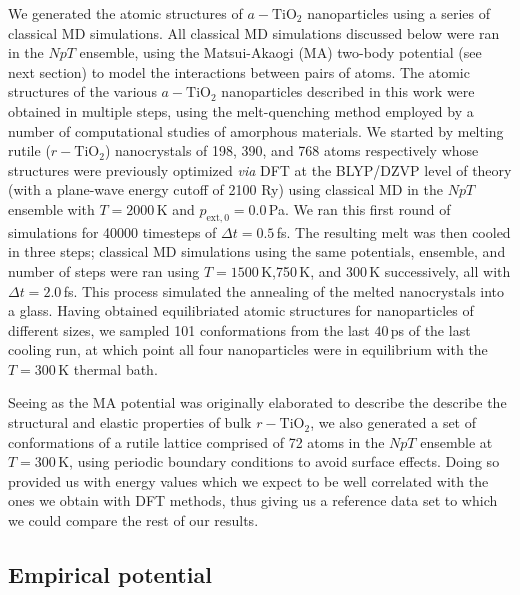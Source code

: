 \documentclass[aps,prb,twocolumn,amsmath,amssymb,superscriptaddress,longbibliography]{revtex4-1}
\newcommand\tab[1][1cm]{\hspace*{#1}} %
\begin{document}
\tab We generated the atomic structures of $a-\text{TiO}_2$ nanoparticles using a series of classical MD simulations. 
All classical MD simulations discussed below were ran in the $NpT$ ensemble, using the Matsui-Akaogi (MA) two-body potential (see next section) to model the interactions between pairs of atoms.
The atomic structures of the various $a-\text{TiO}_2$ nanoparticles described in this work were obtained in multiple steps, using the melt-quenching method employed by a number of computational studies of amorphous materials\cite{ab_initio,melt_quenching}.
We started by melting rutile ($r-\text{TiO}_2$) nanocrystals of 198, 390, and 768 atoms respectively whose structures were previously optimized \textit{via} DFT at the BLYP/DZVP level of theory (with a plane-wave energy cutoff of 2100 Ry) using classical MD in the $NpT$ ensemble with $T = 2000\,$K and $p_{\text{ext},0} = 0.0\,$Pa. 
We ran this first round of simulations for 40000 timesteps of $\Delta t = 0.5\,$fs.
The resulting melt was then cooled in three steps; classical MD simulations using the same potentials, ensemble, and number of steps were ran using $T = 1500\,$K,750$\,$K, and 300$\,$K successively, all with $\Delta t = 2.0\,$fs.
This process simulated the annealing of the melted nanocrystals into a glass.
Having obtained equilibriated atomic structures for nanoparticles of different sizes, we sampled 101 conformations from the last $40\,$ps of the last cooling run, at which point all four nanoparticles were in equilibrium with the $T = 300\,\text{K}$ thermal bath.

\tab Seeing as the MA potential was originally elaborated to describe the describe the structural and elastic properties of bulk $r-\text{TiO}_2$, we also generated a set of conformations of a rutile lattice comprised of 72 atoms in the $NpT$ ensemble at $T = 300\,\text{K}$, using periodic boundary conditions to avoid surface effects.
Doing so provided us with energy values which we expect to be well correlated with the ones we obtain with DFT methods, thus giving us a reference data set to which we could compare the rest of our results.

\subsection{Empirical potential}
\end{document}
